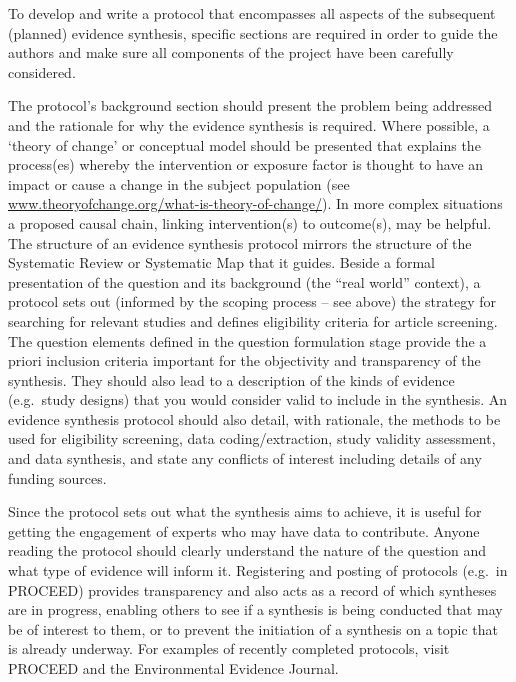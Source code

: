 \documentclass[
  letterpaper,
  DIV=11,
  numbers=noendperiod]{scrreprt}
\begin{document}
To develop and write a protocol that encompasses all aspects of the
subsequent (planned) evidence synthesis, specific sections are required
in order to guide the authors and make sure all components of the
project have been carefully considered.

The protocol's background section should present the problem being
addressed and the rationale for why the evidence synthesis is required.
Where possible, a `theory of change' or conceptual model should be
presented that explains the process(es) whereby the intervention or
exposure factor is thought to have an impact or cause a change in the
subject population (see
\href{http://www.theoryofchange.org/what-is-theory-of-change/}{www.theoryofchange.org/what-is-theory-of-change/}).
In more complex situations a proposed causal chain, linking
intervention(s) to outcome(s), may be helpful. The structure of an
evidence synthesis protocol mirrors the structure of the Systematic
Review or Systematic Map that it guides. Beside a formal presentation of
the question and its background (the ``real world'' context), a protocol
sets out (informed by the scoping process -- see above) the strategy for
searching for relevant studies and defines eligibility criteria for
article screening. The question elements defined in the question
formulation stage provide the a priori inclusion criteria important for
the objectivity and transparency of the synthesis. They should also lead
to a description of the kinds of evidence (e.g.~study designs) that you
would consider valid to include in the synthesis. An evidence synthesis
protocol should also detail, with rationale, the methods to be used for
eligibility screening, data coding/extraction, study validity
assessment, and data synthesis, and state any conflicts of interest
including details of any funding sources.

Since the protocol sets out what the synthesis aims to achieve, it is
useful for getting the engagement of experts who may have data to
contribute. Anyone reading the protocol should clearly understand the
nature of the question and what type of evidence will inform it.
Registering and posting of protocols (e.g.~in PROCEED) provides
transparency and also acts as a record of which syntheses are in
progress, enabling others to see if a synthesis is being conducted that
may be of interest to them, or to prevent the initiation of a synthesis
on a topic that is already underway. For examples of recently completed
protocols, visit PROCEED and the Environmental Evidence Journal.
\end{document}
